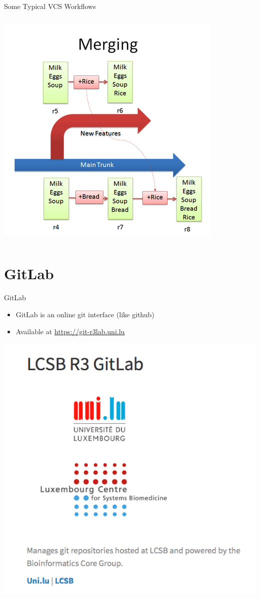 \documentclass[10pt,xcolor=dvipsnames]{beamer}
\begin{document}
\begin{frame}{Some Typical VCS Workflows}
\begin{columns}
\pause
{\includegraphics [scale=0.28]{merging.png}}
\end{columns}
\end{frame}

\section{GitLab}
\begin{frame}{GitLab}
\begin{itemize}
\item GitLab is an online git interface (like github)\\
\item Available at \url{https://git-r3lab.uni.lu}\\[0.2in]
\end{itemize}
\centering
\includegraphics[height=0.70\paperheight]{gitlab.png} 
\end{frame}
\end{document}
